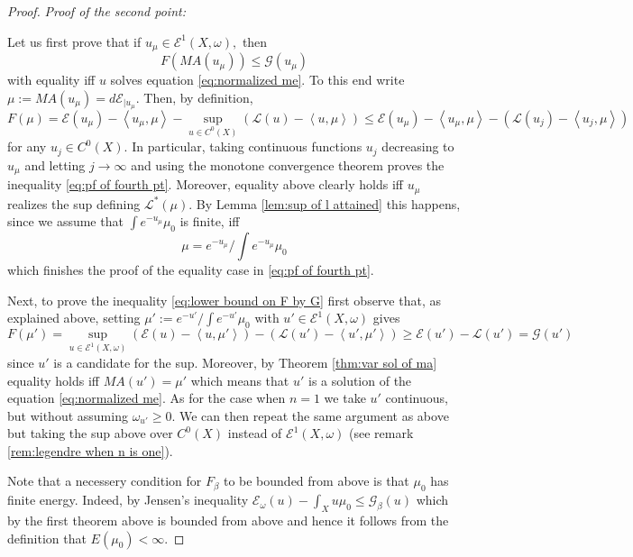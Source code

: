 \documentclass[11pt,oneside,english]{amsart}
\numberwithin{equation}{section}
\numberwithin{figure}{section}
\theoremstyle{plain}
\theoremstyle{plain}
\theoremstyle{plain}
\theoremstyle{plain}
\theoremstyle{remark}
\theoremstyle{definition}
\begin{document}
\begin{proof}
\emph{Proof of the second point:}

Let us first prove that if $u_{\mu}\in\mathcal{E}^{1}(X,\omega),$
then 
\begin{equation}
F(MA(u_{\mu}))\leq\mathcal{G}(u_{\mu})\label{eq:pf of fourth pt}
\end{equation}
 with equality iff $u$ solves equation \ref{eq:normalized me}. To
this end write $\mu:=MA(u_{\mu})=d\mathcal{E}_{|u_{\mu}}.$ Then,
by definition, 
\[
F(\mu)=\mathcal{E}(u_{\mu})-\left\langle u_{\mu},\mu\right\rangle -\sup_{u\in C^{0}(X)}(\mathcal{L}(u)-\left\langle u,\mu\right\rangle )\leq\mathcal{E}(u_{\mu})-\left\langle u_{\mu},\mu\right\rangle -(\mathcal{L}(u_{j})-\left\langle u_{j},\mu\right\rangle )
\]
 for any $u_{j}\in C^{0}(X).$ In particular, taking continuous functions
$u_{j}$ decreasing to $u_{\mu}$ and letting $j\rightarrow\infty$
and using the monotone convergence theorem proves the inequality \ref{eq:pf of fourth pt}.
Moreover, equality above clearly holds iff $u_{\mu}$ realizes the
sup defining $\mathcal{L}^{*}(\mu).$ By Lemma \ref{lem:sup of l attained}
this happens, since we assume that $\int e^{-u_{\mu}}\mu_{0}$ is
finite, iff 
\[
\mu=e^{-u_{\mu}}/\int e^{-u_{\mu}}\mu_{0}
\]
 which finishes the proof of the equality case in \ref{eq:pf of fourth pt}.

Next, to prove the inequality \ref{eq:lower bound on F by G} first
observe that, as explained above, setting $\mu':=e^{-u'}/\int e^{-u'}\mu_{0}$
with $u'\in\mathcal{E}^{1}(X,\omega)$ gives 
\[
F(\mu')=\sup_{u\in\mathcal{E}^{1}(X,\omega)}(\mathcal{E}(u)-\left\langle u,\mu'\right\rangle )-(\mathcal{L}(u')-\left\langle u',\mu'\right\rangle )\geq\mathcal{E}(u')-\mathcal{L}(u')=\mathcal{G}(u')
\]
 since $u'$ is a candidate for the sup. Moreover, by Theorem \ref{thm:var sol of ma}
equality holds iff $MA(u')=\mu'$ which means that $u'$ is a solution
of the  equation \ref{eq:normalized me}. As for the case when $n=1$
we take $u'$ continuous, but without assuming $\omega_{u'}\geq0.$
We can then repeat the same argument as above but taking the sup above
over $C^{0}(X)$ instead of $\mathcal{E}^{1}(X,\omega)$ (see remark
\ref{rem:legendre when n is one}).

Note that a necessery condition for $F_{\beta}$ to be bounded from
above is that $\mu_{0}$ has finite energy. Indeed, by Jensen's inequality
$\mathcal{E}_{\omega}(u)-\int_{X}u\mu_{0}\leq\mathcal{G}_{\beta}(u)$
which by the first theorem above is bounded from above and hence it
follows from the definition that $E(\mu_{0})<\infty.$ 
\end{proof}
\end{document}
